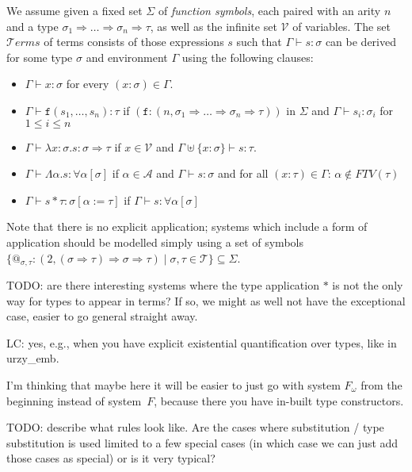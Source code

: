 \documentclass[runningheads,a4paper]{llncs}
\newcommand{\Typevars}{\mathcal{A}}
\newcommand{\Vars}{\mathcal{V}}
\newcommand{\Types}{\mathcal{T}}
\newcommand{\Terms}{\mathcal{T}\!\mathit{erms}}
\newcommand{\quant}[2]{\forall #1[#2]}
\newcommand{\arrtype}{\Rightarrow}
\newcommand{\abs}[2]{\lambda #1.#2}
\newcommand{\tabs}[2]{\Lambda #1.#2}
\newcommand{\tapp}[2]{#1 * #2}
\newcommand{\subst}[2]{#1:=#2}
\newcommand{\FTV}{\mathit{FTV}}
\begin{document}
\begin{definition}
We assume given a fixed set $\Sigma$ of \emph{function symbols}, each
paired with an arity $n$ and a type $\sigma_1 \arrtype \dots \arrtype
\sigma_n \arrtype \tau$, as well as the infinite set $\Vars$ of variables.
The set $\Terms$ of terms consists of those expressions $s$ such that
$\Gamma \vdash s : \sigma$ can be derived for some type $\sigma$ and
environment $\Gamma$ using the following clauses:
\begin{itemize}
\item $\Gamma \vdash x : \sigma$ for every $(x : \sigma) \in \Gamma$.
\item $\Gamma \vdash \mathtt{f}(s_1,\dots,s_n) : \tau$ if
  $(\mathtt{f} : (n,\sigma_1 \arrtype \dots \arrtype \sigma_n \arrtype
  \tau))$ in $\Sigma$ and $\Gamma \vdash s_i : \sigma_i$ for $1 \leq
  i \leq n$
\item $\Gamma \vdash \abs{x:\sigma}{s} : \sigma \arrtype \tau$ if $x
  \in \Vars$ and $\Gamma \uplus \{ x : \sigma \} \vdash s : \tau$.
\item $\Gamma \vdash \tabs{\alpha}{s} : \quant{\alpha}{\sigma}$ if
  $\alpha \in \Typevars$ and $\Gamma \vdash s : \sigma$ and for all
  $(x : \tau) \in \Gamma$: $\alpha \notin \FTV(\tau)$
\item $\Gamma \vdash \tapp{s}{\tau} : \sigma[\subst{\alpha}{\tau}]$ if
  $\Gamma \vdash s : \quant{\alpha}{\sigma}$
\end{itemize}
\end{definition}

Note that there is no explicit application; systems which include a form
of application should be modelled simply using a set of symbols $\{
@_{\sigma,\tau}: (2,(\sigma \arrtype \tau) \arrtype \sigma \arrtype \tau)
\mid \sigma,\tau \in \Types \} \subseteq \Sigma$.

TODO: are there interesting systems where the type application $*$ is
not the only way for types to appear in terms?  If so, we might as well
not have the exceptional case, easier to go general straight away.

LC: yes, e.g., when you have explicit existential quantification over
types, like in urzy\_emb.

I'm thinking that maybe here it will be easier to just go with
system $F_\omega$ from the beginning instead of system~$F$, because
there you have in-built type constructors.

TODO: describe what rules look like.  Are the cases where substitution
/ type substitution is used limited to a few special cases (in which
case we can just add those cases as special) or is it very typical?
\end{document}

